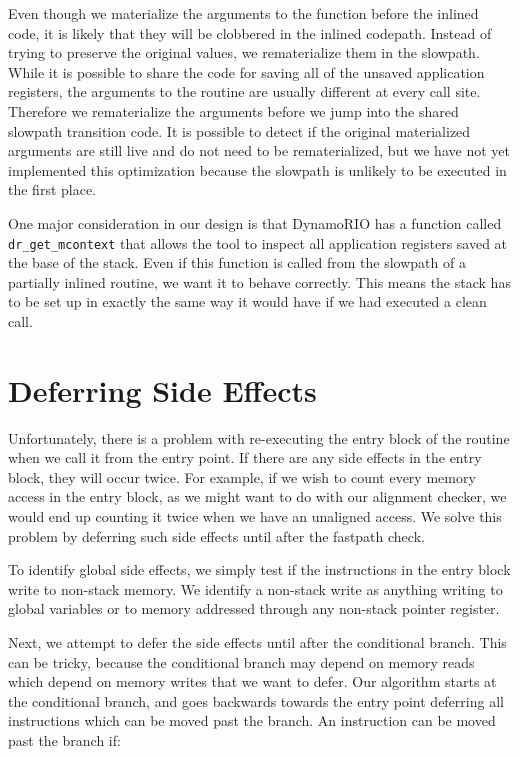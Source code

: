 Even though we materialize the arguments to the function before the inlined
code, it is likely that they will be clobbered in the inlined codepath.  Instead
of trying to preserve the original values, we rematerialize them in the
slowpath.  While it is possible to share the code for saving all of the unsaved
application registers, the arguments to the routine are usually different at
every call site.  Therefore we rematerialize the arguments before we jump into
the shared slowpath transition code.  It is possible to detect if the original
materialized arguments are still live and do not need to be rematerialized, but
we have not yet implemented this optimization because the slowpath is unlikely
to be executed in the first place.

One major consideration in our design is that DynamoRIO has a function called
{\tt dr\_get\_mcontext} that allows the tool to inspect all application
registers saved at the base of the stack.  Even if this function is called from
the slowpath of a partially inlined routine, we want it to behave correctly.
This means the stack has to be set up in exactly the same way it would have if
we had executed a clean call.

\section{Deferring Side Effects}

Unfortunately, there is a problem with re-executing the entry block of the
routine when we call it from the entry point.  If there are any side effects in
the entry block, they will occur twice.  For example, if we wish to count every
memory access in the entry block, as we might want to do with our alignment
checker, we would end up counting it twice when we have an unaligned access.  We
solve this problem by deferring such side effects until after the fastpath
check.

To identify global side effects, we simply test if the instructions in the entry
block write to non-stack memory.  We identify a non-stack write as anything
writing to global variables or to memory addressed through any non-stack pointer
register.

Next, we attempt to defer the side effects until after the conditional branch.
This can be tricky, because the conditional branch may depend on memory reads
which depend on memory writes that we want to defer.  Our algorithm starts at
the conditional branch, and goes backwards towards the entry point deferring all
instructions which can be moved past the branch.  An instruction can be moved
past the branch if:

